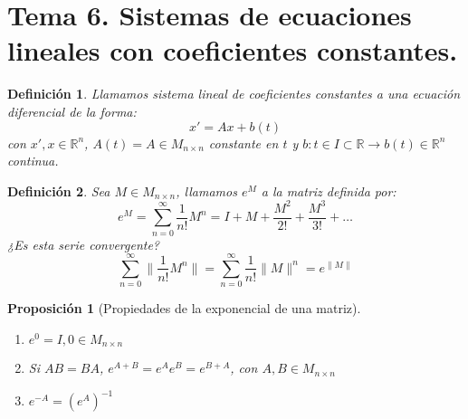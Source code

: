 \documentclass{article}
\providecommand{\norm}[1]{\lVert#1\rVert}
\theoremstyle{theorem-style}  %
\newtheorem{proposition}[theorem]{Proposición}
\theoremstyle{definition-style}
\newtheorem{definition}{Definición}[section]
\theoremstyle{example-style}
\begin{document}
\section{Tema 6. Sistemas de ecuaciones lineales con coeficientes constantes.}
\begin{definition}
	Llamamos \emph{sistema lineal de coeficientes constantes} a una ecuación diferencial de la forma:
	\[ x'=Ax+b(t) \]
	con $ x', x\in\mathbb{R}^n $, $ A(t)=A\in M_{n\times n} $ constante en $ t $ y $ b:t\in I\subset\mathbb{R}\longrightarrow b(t)\in\mathbb{R}^n $ continua.
\end{definition}
\begin{definition}
	Sea $ M \in M_{n\times n} $, llamamos \emph{$ e^M $} a la matriz definida por:\[ e^M=\sum_{n=0}^{\infty} \frac{1}{n!}M^n=I+M+\frac{M^2}{2!}+\frac{M^3}{3!}+\dots \]
	¿Es esta serie convergente?
	\[ \sum_{n=0}^{\infty}\norm{\frac{1}{n!}M^n}=\sum_{n=0}^{\infty}\frac{1}{n!}\norm{M}^n=e^{\norm{M}} \]
\end{definition}
\begin{proposition}[Propiedades de la exponencial de una matriz] \ 
	\begin{enumerate}[\quad i)]
		\item $ e^0 =I, 0 \in M_{n\times n}$
		\item Si $ AB=BA $, $ e^{A+B}=e^Ae^B=e^{B+A} $, con $ A,B\in M_{n\times n} $
		\item $ e^{-A}=(e^A)^{-1} $
	\end{enumerate}
\end{proposition}
\end{document}
